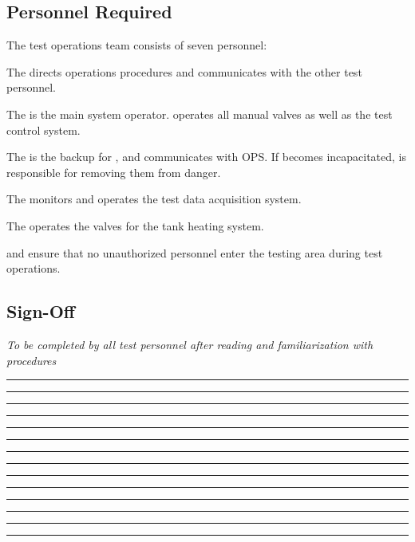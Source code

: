 \subsection{Personnel Required}
The test operations team consists of seven personnel:
\begin{checklist}
    \item The \opsfull{} directs operations procedures and communicates with the other test personnel.
    \item The \primaryfull{} is the main system operator. \primary{} operates all manual valves as well as the test control system.
    \item The \secondaryfull{} is the backup for \primary{}, and communicates with OPS. If \primary{} becomes incapacitated, \secondary{} is responsible for removing them from danger.
    \item The \daqfull{} monitors and operates the test data acquisition system.
    \item The \heatfull{} operates the valves for the tank heating system.
    \item \perifull{} and \periifull{} ensure that no unauthorized personnel enter the testing area during test operations.
\end{checklist}
\setcounter{checklistnum}{0}

\subsection{Sign-Off}
\textit{To be completed by all test personnel after reading and familiarization with procedures}
\begin{checklist}
    \item \opsfull      \tabto{25em}\rule{10em}{0.4pt}\hspace{5em}\rule{10em}{0.4pt}
    \item \primaryfull  \tabto{25em}\rule{10em}{0.4pt}\hspace{5em}\rule{10em}{0.4pt}
    \item \secondaryfull\tabto{25em}\rule{10em}{0.4pt}\hspace{5em}\rule{10em}{0.4pt}
    \item \daqfull      \tabto{25em}\rule{10em}{0.4pt}\hspace{5em}\rule{10em}{0.4pt}
    \item \heatfull     \tabto{25em}\rule{10em}{0.4pt}\hspace{5em}\rule{10em}{0.4pt}
    \item \perifull     \tabto{25em}\rule{10em}{0.4pt}\hspace{5em}\rule{10em}{0.4pt}
    \item \periifull    \tabto{25em}\rule{10em}{0.4pt}\hspace{5em}\rule{10em}{0.4pt}
\end{checklist}
\setcounter{checklistnum}{0}

